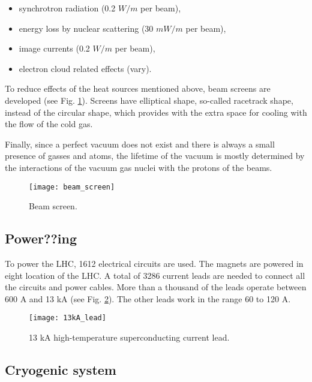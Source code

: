 \begin{itemize}
\item synchrotron radiation (0.2 $W/m$ per beam),
\item energy loss by nuclear scattering (30 $mW/m$ per beam),
\item image currents (0.2 $W/m$ per beam),
\item electron cloud related effects (vary).
\end{itemize}

To reduce effects of the heat sources mentioned above, beam screens are developed (see Fig. \ref{beam_screen}). Screens have elliptical shape, so-called racetrack shape, instead of the circular shape, which provides with the extra space for cooling with the flow of the cold gas.

Finally, since a perfect vacuum does not exist and there is always a small presence of gasses and atoms, the lifetime of the vacuum is mostly determined by the interactions of the vacuum gas nuclei with the protons of the beams. 


\begin{figure}[H]
  \centering
  \texttt{[image: beam\_screen]}
  \caption{Beam screen.}\label{beam_screen}
\end{figure}

\subsection{Power??ing}\label{sec:power}
To power the LHC, 1612 electrical circuits are used. The magnets are powered in eight location of the LHC. 
A total of 3286 current leads are needed to connect all the circuits and power cables. More than a thousand of the leads operate between 600 A and 13 kA (see Fig. \ref{13kA_lead}). The other leads work in the range 60 to 120 A. 

\begin{figure}[H]
  \centering
  \texttt{[image: 13kA\_lead]}
  \caption{13 kA high-temperature superconducting current lead.}\label{13kA_lead}
\end{figure}












\subsection{Cryogenic system}\label{sec:cryogenic}


